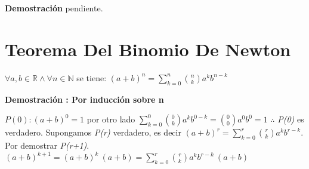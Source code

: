 \documentclass{book}
\begin{document}
\textbf{Demostración} pendiente.

\section{Teorema Del Binomio De Newton}
$\forall a,b\in{\mathbb{R}}\land \forall{n\in{\mathbb{N}}}$ se tiene:
$(a+b)^n=\sum_{k=0}^n \binom{n}{k} a^kb^{n-k}$

\textbf{Demostración : Por inducción sobre n}

$P(0):(a+b)^0=1$ por otro lado $\sum_{k=0}^0 \binom{0}{k} a^kb^{0-k}=\binom{0}{0}a^0b^0=1$
$\therefore$ \textit{P(0)} es verdadero.
Supongamos \textit{P(r)} verdadero, es decir $(a+b)^r=\sum_{k=0}^r \binom{r}{k} a^kb^{r-k}$. Por demostrar \textit{P(r+1)}.
$(a+b)^{k+1}=(a+b)^k \ (a+b)=\sum_{k=0}^r \binom{r}{k} a^kb^{r-k} \ (a+b)$
\end{document}
